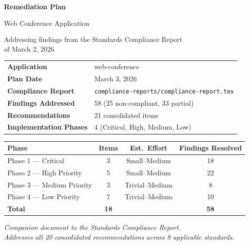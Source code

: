 \documentclass[11pt,letterpaper]{article}
\begin{document}
\begin{titlepage}
\centering
\vspace*{2cm}
{\Huge\bfseries\color{headerbg} Remediation Plan\par}
\vspace{0.5cm}
{\LARGE\color{headerbg!70} Web Conference Application\par}
\vspace{1cm}
{\large Addressing findings from the Standards Compliance Report\\of March 2, 2026\par}
\vspace{2cm}

\begin{tabular}{ll}
\toprule
\textbf{Application} & web-conference \\
\textbf{Plan Date} & March 3, 2026 \\
\textbf{Compliance Report} & \texttt{compliance-reports/compliance-report.tex} \\
\textbf{Findings Addressed} & 58 (25 non-compliant, 33 partial) \\
\textbf{Recommendations} & 21 consolidated items \\
\textbf{Implementation Phases} & 4 (Critical, High, Medium, Low) \\
\bottomrule
\end{tabular}

\vspace{2cm}

\begin{tabular}{lccc}
\toprule
\textbf{Phase} & \textbf{Items} & \textbf{Est.\ Effort} & \textbf{Findings Resolved} \\
\midrule
\rowcolor{critical!15} Phase 1 --- Critical & 3 & Small--Medium & 18 \\
\rowcolor{major!15} Phase 2 --- High Priority & 5 & Small--Medium & 22 \\
\rowcolor{minor!15} Phase 3 --- Medium Priority & 3 & Trivial--Medium & 8 \\
\rowcolor{notapplicable!10} Phase 4 --- Low Priority & 7 & Trivial--Medium & 10 \\
\midrule
\textbf{Total} & \textbf{18} & & \textbf{58} \\
\bottomrule
\end{tabular}

\vfill
{\small\textit{Companion document to the Standards Compliance Report.\\Addresses all 20 consolidated recommendations across 8 applicable standards.}\par}
\end{titlepage}
\end{document}

